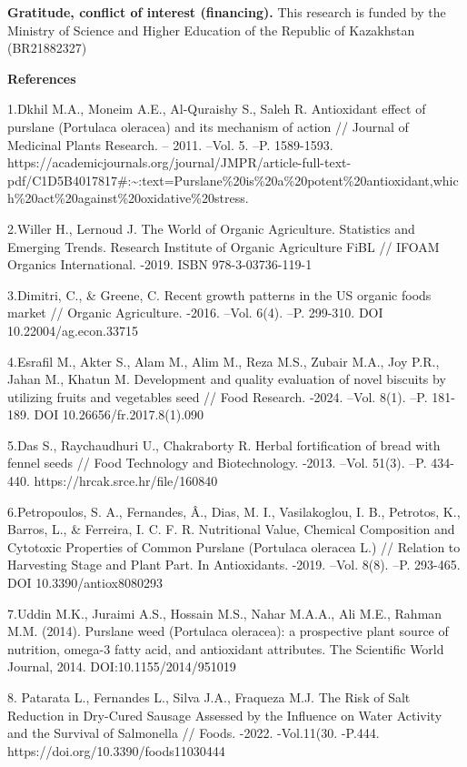 {\bfseries Gratitude, conflict of interest (financing).} This research is
funded by the Ministry of Science and Higher Education of the Republic
of Kazakhstan (BR21882327)

{\bfseries References}

1.Dkhil M.A., Moneim A.E., Al-Quraishy S., Saleh R. Antioxidant effect
of purslane (Portulaca oleracea) and its mechanism of action // Journal
of Medicinal Plants Research. -- 2011. --Vol. 5. --P. 1589-1593.
https://academicjournals.org/journal/JMPR/article-full-text-pdf/C1D5B4017817\#:\textasciitilde:text=Purslane\%20is\%20a\%20potent\%20antioxidant,which\%20act\%20against\%20oxidative\%20stress.

2.Willer H., Lernoud J. The World of Organic Agriculture. Statistics and
Emerging Trends. Research Institute of Organic Agriculture FiBL // IFOAM
Organics International. -2019. ISBN 978-3-03736-119-1

3.Dimitri, C., \& Greene, C. Recent growth patterns in the US organic
foods market // Organic Agriculture. -2016. --Vol. 6(4). --P. 299-310.
DOI 10.22004/ag.econ.33715

4.Esrafil M., Akter S., Alam M., Alim M., Reza M.S., Zubair M.A., Joy
P.R., Jahan M., Khatun M. Development and quality evaluation of novel
biscuits by utilizing fruits and vegetables seed // Food Research.
-2024. --Vol. 8(1). --P. 181-189. DOI 10.26656/fr.2017.8(1).090

5.Das S., Raychaudhuri U., Chakraborty R. Herbal fortification of bread
with fennel seeds // Food Technology and Biotechnology. -2013. --Vol.
51(3). --P. 434-440. https://hrcak.srce.hr/file/160840

6.Petropoulos, S. A., Fernandes, Â., Dias, M. I., Vasilakoglou, I. B.,
Petrotos, K., Barros, L., \& Ferreira, I. C. F. R. Nutritional Value,
Chemical Composition and Cytotoxic Properties of Common Purslane
(Portulaca oleracea L.) // Relation to Harvesting Stage and Plant Part.
In Antioxidants. -2019. --Vol. 8(8). --P. 293-465. DOI
10.3390/antiox8080293

7.Uddin M.K., Juraimi A.S., Hossain M.S., Nahar M.A.A., Ali M.E., Rahman
M.M. (2014). Purslane weed (Portulaca oleracea): a prospective plant
source of nutrition, omega-3 fatty acid, and antioxidant attributes. The
Scientific World Journal, 2014. DOI:10.1155/2014/951019

8. Patarata L., Fernandes L., Silva J.A., Fraqueza M.J. The Risk of Salt
Reduction in Dry-Cured Sausage Assessed by the Influence on Water
Activity and the Survival of Salmonella // Foods. -2022. -Vol.11(30.
-P.444. https://doi.org/10.3390/foods11030444

